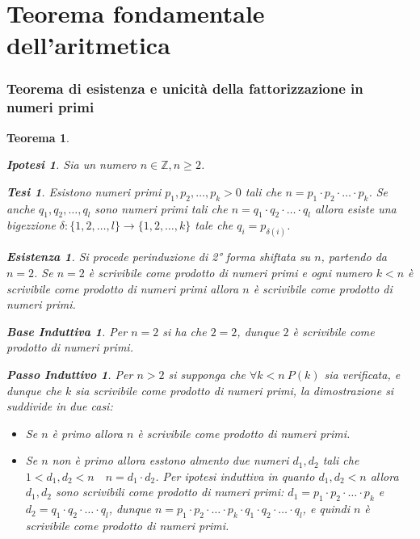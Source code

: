 \documentclass{article}
\makeatletter
\renewenvironment{proof}[1][\proofname]{\par
    \pushQED{\qed}%
    \normalfont \topsep6\p@\@plus6\p@\relax
    \trivlist
    \item\relax
    {\itshape
    #1\@addpunct{.}}\hspace\labelsep\ignorespaces
    }{%
    \popQED\endtrivlist\@endpefalse
}
\newtheorem{theorem}{Teorema}[part]
\newtheorem{ipothesis}[lemma]{Ipotesi}
\newtheorem{thesis}[lemma]{Tesi}
\newtheorem*{existence}{Esistenza}
\newtheorem*{base}{Base Induttiva}
\newtheorem*{step}{Passo Induttivo}
\makeatother
\begin{document}
\part{Teorema fondamentale dell'aritmetica}
\section{Teorema di esistenza e unicità della fattorizzazione in numeri primi}
\begin{theorem}
    \begin{ipothesis}
        Sia un numero \(n\in\mathbb{Z}, n\geq 2\).
    \end{ipothesis}
    \begin{thesis}
        Esistono numeri primi \(p_1,p_2,\ldots,p_k>0\) tali che \(n=p_1\cdot p_2\cdot\ldots\cdot p_k\).
        Se anche \(q_1,q_2,\ldots,q_l\) sono numeri primi tali che \(n=q_1\cdot q_2\cdot\ldots\cdot q_l\) allora esiste una bigezzione \(\delta:\{1,2,\ldots,l\}\rightarrow \{1,2,\ldots,k\}\) tale che \(q_i=p_{\delta(i)}\).
    \end{thesis}
    \begin{proof}
        \begin{existence}
            Si procede perinduzione di 2° forma shiftata su \(n\), partendo da \(n=2\).
            Se \(n=2\) è scrivibile come prodotto di numeri primi e ogni numero \(k<n\) è scrivibile come prodotto di numeri primi allora \(n\) è scrivibile come prodotto di numeri primi.
            \begin{base}
                Per \(n=2\) si ha che \(2=2\), dunque \(2\) è scrivibile come prodotto di numeri primi.
            \end{base}
            \begin{step}
                Per \(n>2\) si supponga che \(\forall k<n\ P(k)\) sia verificata, e dunque che \(k\) sia scrivibile come prodotto di numeri primi, la dimostrazione si suddivide in due casi:
                \begin{itemize}
                    \item Se \(n\) è primo allora \(n\) è scrivibile come prodotto di numeri primi.
                    \item Se \(n\) non è primo allora esstono almento due numeri \(d_1,d_2\) tali che \(1<d_1,d_2<n\quad n=d_1\cdot d_2\). Per ipotesi induttiva in quanto \(d_1,d_2<n\) allora \(d_1,d_2\) sono scrivibili come prodotto di numeri primi: \(d_1=p_1\cdot p_2\cdot\ldots\cdot p_k\) e \(d_2=q_1\cdot q_2\cdot\ldots\cdot q_l\), dunque \(n=p_1\cdot p_2\cdot\ldots\cdot p_k\cdot q_1\cdot q_2\cdot\ldots\cdot q_l\), e quindi \(n\) è scrivibile come prodotto di numeri primi.

\end{itemize}
\end{step}
\end{existence}
\end{proof}
\end{theorem}
\end{document}
